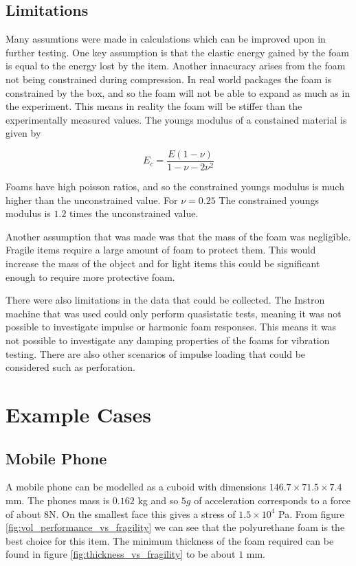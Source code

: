 \documentclass{article}
\begin{document}
\subsection{Limitations}

Many assumtions were made in calculations which can be improved upon in further testing.
One key assumption is that the elastic energy gained by the foam is equal to the energy lost by the item.
Another innacuracy arises from the foam not being constrained during compression.
In real world packages the foam is constrained by the box, and so the foam will not be able to expand as much as in the experiment.
This means in reality the foam will be stiffer than the experimentally measured values.
The youngs modulus of a constained material is given by

\begin{equation}
    E_{c} = \frac{E(1-\nu)}{1 - \nu - 2\nu^2}
\end{equation}

Foams have high poisson ratios, and so the constrained youngs modulus is much higher than the unconstrained value.
For $\nu = 0.25$ The constrained youngs modulus is $1.2$ times the unconstrained value.

Another assumption that was made was that the mass of the foam was negligible.
Fragile items require a large amount of foam to protect them.
This would increase the mass of the object and for light items this could be significant
enough to require more protective foam.

There were also limitations in the data that could be collected. The Instron machine that was used
could only perform quasistatic tests, meaning it was not possible to investigate impulse or harmonic foam responses.
This means it was not possible to investigate any damping properties of the foams for vibration testing.
There are also other scenarios of impulse loading that could be considered such as perforation.

\section{Example Cases}

\subsection{Mobile Phone}
A mobile phone can be modelled as a cuboid with dimensions $ 146.7 \times 71.5 \times 7.4 $ mm.
The phones mass is $ 0.162 $ kg and so $5g$ of acceleration corresponds to a force of about $8$N.
On the smallest face this gives a stress of $1.5\times 10^4$ Pa.
From figure \ref{fig:vol_performance_vs_fragility} we can see that the polyurethane foam is the best choice for this item.
The minimum thickness of the foam required can be found in figure \ref{fig:thickness_vs_fragility} to be about $ 1 $ mm.
\end{document}
